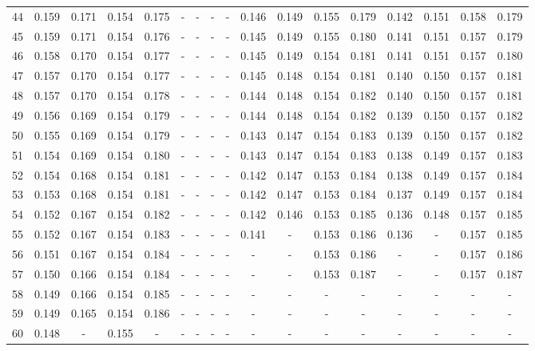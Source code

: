 \documentclass{report}
\begin{document}
\begin{appendices}
\begin{table}
\begin{tabular}{|c|cccc|cccc|cccc|cccc|}
44 & 0.159 & 0.171 & 0.154 & 0.175 &   -   &   -   &   -   &   -   & 0.146 & 0.149 & 0.155 & 0.179 & 0.142 & 0.151 & 0.158 & 0.179\\
45 & 0.159 & 0.171 & 0.154 & 0.176 &   -   &   -   &   -   &   -   & 0.145 & 0.149 & 0.155 & 0.180 & 0.141 & 0.151 & 0.157 & 0.179\\
46 & 0.158 & 0.170 & 0.154 & 0.177 &   -   &   -   &   -   &   -   & 0.145 & 0.149 & 0.154 & 0.181 & 0.141 & 0.151 & 0.157 & 0.180\\
47 & 0.157 & 0.170 & 0.154 & 0.177 &   -   &   -   &   -   &   -   & 0.145 & 0.148 & 0.154 & 0.181 & 0.140 & 0.150 & 0.157 & 0.181\\
48 & 0.157 & 0.170 & 0.154 & 0.178 &   -   &   -   &   -   &   -   & 0.144 & 0.148 & 0.154 & 0.182 & 0.140 & 0.150 & 0.157 & 0.181\\
49 & 0.156 & 0.169 & 0.154 & 0.179 &   -   &   -   &   -   &   -   & 0.144 & 0.148 & 0.154 & 0.182 & 0.139 & 0.150 & 0.157 & 0.182\\
50 & 0.155 & 0.169 & 0.154 & 0.179 &   -   &   -   &   -   &   -   & 0.143 & 0.147 & 0.154 & 0.183 & 0.139 & 0.150 & 0.157 & 0.182\\
51 & 0.154 & 0.169 & 0.154 & 0.180 &   -   &   -   &   -   &   -   & 0.143 & 0.147 & 0.154 & 0.183 & 0.138 & 0.149 & 0.157 & 0.183\\
52 & 0.154 & 0.168 & 0.154 & 0.181 &   -   &   -   &   -   &   -   & 0.142 & 0.147 & 0.153 & 0.184 & 0.138 & 0.149 & 0.157 & 0.184\\
53 & 0.153 & 0.168 & 0.154 & 0.181 &   -   &   -   &   -   &   -   & 0.142 & 0.147 & 0.153 & 0.184 & 0.137 & 0.149 & 0.157 & 0.184\\
54 & 0.152 & 0.167 & 0.154 & 0.182 &   -   &   -   &   -   &   -   & 0.142 & 0.146 & 0.153 & 0.185 & 0.136 & 0.148 & 0.157 & 0.185\\
55 & 0.152 & 0.167 & 0.154 & 0.183 &   -   &   -   &   -   &   -   & 0.141 &   -   & 0.153 & 0.186 & 0.136 &   -   & 0.157 & 0.185\\
56 & 0.151 & 0.167 & 0.154 & 0.184 &   -   &   -   &   -   &   -   &   -   &   -   & 0.153 & 0.186 &   -   &   -   & 0.157 & 0.186\\
57 & 0.150 & 0.166 & 0.154 & 0.184 &   -   &   -   &   -   &   -   &   -   &   -   & 0.153 & 0.187 &   -   &   -   & 0.157 & 0.187\\
58 & 0.149 & 0.166 & 0.154 & 0.185 &   -   &   -   &   -   &   -   &   -   &   -   &   -   &   -   &   -   &   -   &   -   &   -  \\
59 & 0.149 & 0.165 & 0.154 & 0.186 &   -   &   -   &   -   &   -   &   -   &   -   &   -   &   -   &   -   &   -   &   -   &   -  \\
60 & 0.148 &   -   & 0.155 &   -   &   -   &   -   &   -   &   -   &   -   &   -   &   -   &   -   &   -   &   -   &   -   &   -  \\
\hline
\end{tabular}
\end{table}


\end{appendices}
\end{document}
